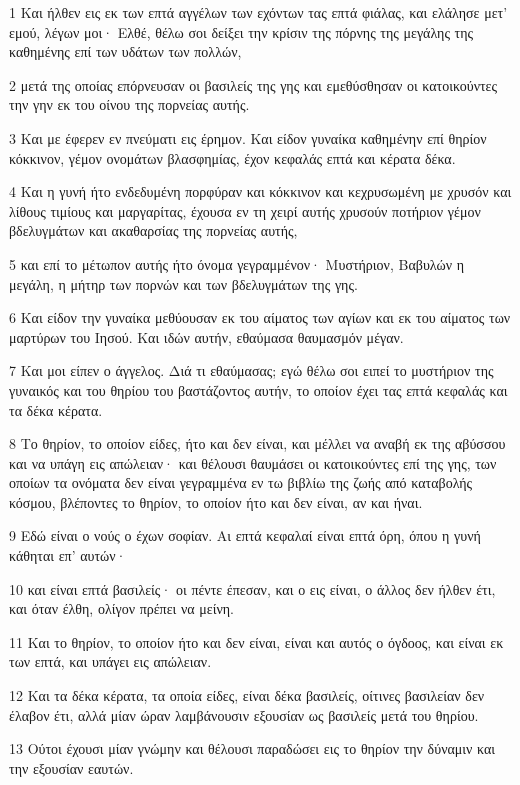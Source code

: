 \par 1 Και ήλθεν εις εκ των επτά αγγέλων των εχόντων τας επτά φιάλας, και ελάλησε μετ' εμού, λέγων μοι· Ελθέ, θέλω σοι δείξει την κρίσιν της πόρνης της μεγάλης της καθημένης επί των υδάτων των πολλών,
\par 2 μετά της οποίας επόρνευσαν οι βασιλείς της γης και εμεθύσθησαν οι κατοικούντες την γην εκ του οίνου της πορνείας αυτής.
\par 3 Και με έφερεν εν πνεύματι εις έρημον. Και είδον γυναίκα καθημένην επί θηρίον κόκκινον, γέμον ονομάτων βλασφημίας, έχον κεφαλάς επτά και κέρατα δέκα.
\par 4 Και η γυνή ήτο ενδεδυμένη πορφύραν και κόκκινον και κεχρυσωμένη με χρυσόν και λίθους τιμίους και μαργαρίτας, έχουσα εν τη χειρί αυτής χρυσούν ποτήριον γέμον βδελυγμάτων και ακαθαρσίας της πορνείας αυτής,
\par 5 και επί το μέτωπον αυτής ήτο όνομα γεγραμμένον· Μυστήριον, Βαβυλών η μεγάλη, η μήτηρ των πορνών και των βδελυγμάτων της γης.
\par 6 Και είδον την γυναίκα μεθύουσαν εκ του αίματος των αγίων και εκ του αίματος των μαρτύρων του Ιησού. Και ιδών αυτήν, εθαύμασα θαυμασμόν μέγαν.
\par 7 Και μοι είπεν ο άγγελος. Διά τι εθαύμασας; εγώ θέλω σοι ειπεί το μυστήριον της γυναικός και του θηρίου του βαστάζοντος αυτήν, το οποίον έχει τας επτά κεφαλάς και τα δέκα κέρατα.
\par 8 Το θηρίον, το οποίον είδες, ήτο και δεν είναι, και μέλλει να αναβή εκ της αβύσσου και να υπάγη εις απώλειαν· και θέλουσι θαυμάσει οι κατοικούντες επί της γης, των οποίων τα ονόματα δεν είναι γεγραμμένα εν τω βιβλίω της ζωής από καταβολής κόσμου, βλέποντες το θηρίον, το οποίον ήτο και δεν είναι, αν και ήναι.
\par 9 Εδώ είναι ο νούς ο έχων σοφίαν. Αι επτά κεφαλαί είναι επτά όρη, όπου η γυνή κάθηται επ' αυτών·
\par 10 και είναι επτά βασιλείς· οι πέντε έπεσαν, και ο εις είναι, ο άλλος δεν ήλθεν έτι, και όταν έλθη, ολίγον πρέπει να μείνη.
\par 11 Και το θηρίον, το οποίον ήτο και δεν είναι, είναι και αυτός ο όγδοος, και είναι εκ των επτά, και υπάγει εις απώλειαν.
\par 12 Και τα δέκα κέρατα, τα οποία είδες, είναι δέκα βασιλείς, οίτινες βασιλείαν δεν έλαβον έτι, αλλά μίαν ώραν λαμβάνουσιν εξουσίαν ως βασιλείς μετά του θηρίου.
\par 13 Ούτοι έχουσι μίαν γνώμην και θέλουσι παραδώσει εις το θηρίον την δύναμιν και την εξουσίαν εαυτών.
